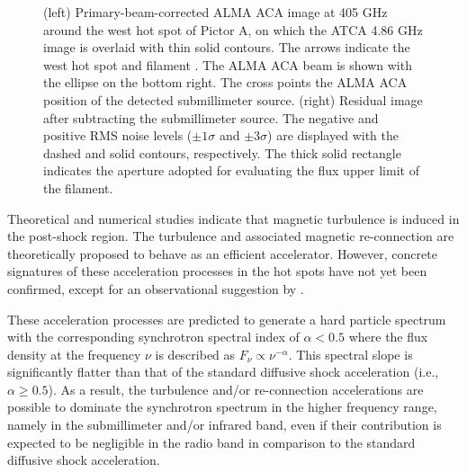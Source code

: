 \documentclass[twocolumn]{aastex631}
\begin{document}
\begin{figure}[t]
\caption{
(left) 
Primary-beam-corrected ALMA ACA image at 405 GHz around the west hot spot of Pictor A,
on which the ATCA 4.86 GHz image 
\citep{isobe2017, isobe2020} 
is overlaid with thin solid contours. 
The arrows indicate the west hot spot and filament \citep{Roser1987}.
The ALMA ACA beam is shown with the ellipse on the bottom right. 
The cross points the ALMA ACA position of the detected submillimeter source.
(right) 
Residual image after subtracting the submillimeter source.
The negative and positive RMS noise levels 
($\pm 1 \sigma$ and $\pm 3 \sigma$)
are displayed with the dashed and solid contours, respectively.
The thick solid rectangle indicates the aperture  
adopted for evaluating the flux upper limit of the filament. }
\label{fig:image}
\end{figure}


Theoretical and numerical studies \citep[e.g.,][]{inoue2009} indicate that magnetic turbulence is induced in the post-shock region.
The turbulence \citep[e.g.,][]{asano2014} and 
associated magnetic re-connection \citep[e.g.,][]{sironi2014} 
are theoretically proposed to behave as an efficient accelerator. 
However, concrete signatures of these acceleration processes 
in the hot spots have not yet been confirmed, 
except for an observational suggestion by \citet{orienti2017}.

These acceleration processes are predicted 
to generate a hard particle spectrum 
\citep[e.g.,][]{asano2014,sironi2014} 
with the corresponding synchrotron spectral index of $\alpha < 0.5$ 
where the flux density at the frequency $\nu$ 
is described as $F_\nu \propto \nu^{-\alpha}$.
This spectral slope is significantly flatter than 
that of the standard diffusive shock acceleration (i.e., $\alpha \ge 0.5$).
As a result, 
the turbulence and/or re-connection accelerations are possible 
to dominate the synchrotron spectrum in the higher frequency range,
namely in the submillimeter and/or infrared band,
even if their contribution is expected to be negligible 
in the radio band in comparison to the standard diffusive shock acceleration.
\end{document}
